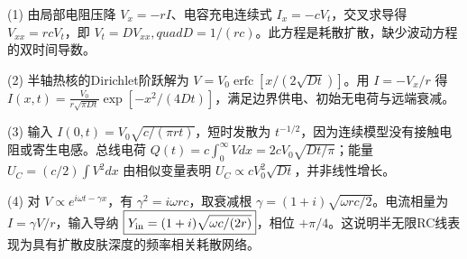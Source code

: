 (1) 由局部电阻压降 \(V_x=-rI\)、电容充电连续式 \(I_x=-cV_t\)，交叉求导得 \(V_{xx}=rcV_t\)，即 \(\boxed{V_t=D V_{xx},quad D=1/(rc)}\)。此方程是耗散扩散，缺少波动方程的双时间导数。

(2) 半轴热核的Dirichlet阶跃解为 \(\boxed{V=V_0\operatorname{erfc}[x/(2\sqrt{Dt})]}\)。用 \(I=-V_x/r\) 得 \(I(x,t)=\frac{V_0}{r\sqrt{\pi Dt}}\exp[-x^2/(4Dt)]\)，满足边界供电、初始无电荷与远端衰减。

(3) 输入 \(I(0,t)=V_0\sqrt{c/(\pi rt)}\)，短时发散为 \(t^{-1/2}\)，因为连续模型没有接触电阻或寄生电感。总线电荷 \(Q(t)=c\int_0^\infty Vdx=2cV_0\sqrt{Dt/\pi}\)；能量 \(U_C=(c/2)\int V^2dx\) 由相似变量表明 \(U_C\propto cV_0^2\sqrt{Dt}\)，并非线性增长。

(4) 对 \(V\propto e^{i\omega t-\gamma x}\)，有 \(\gamma^2=i\omega rc\)，取衰减根 \(\gamma=(1+i)\sqrt{\omega rc/2}\)。电流相量为 \(I=\gamma V/r\)，输入导纳 \(\boxed{Y_{\rm in}=(1+i)\sqrt{\omega c/(2r)}}\)，相位 \(+\pi/4\)。这说明半无限RC线表现为具有扩散皮肤深度的频率相关耗散网络。
